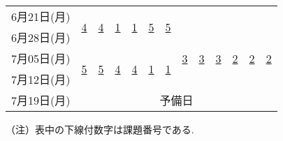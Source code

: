 \documentclass[12pt]{jarticle}
\begin{document}
\begin{table}[htb]
\begin{center}
\begin{tabular}{|l||c|c|c|c|c|c||c|c|c|c|c|c|}
            6月21日(月) & \multirow{2}{*}{{\underline{4}}}                             & \multirow{2}{*}{{\underline{4}}} & \multirow{2}{*}{{\underline{1}}} & \multirow{2}{*}{{\underline{1}}} & \multirow{2}{*}{{\underline{5}}} & \multirow{2}{*}{{\underline{5}}} &                                  &                                  &                                  &                                  &                                  &                                  \\ \cline{8-13}
            6月28日(月) &                                                              &                                  &                                  &                                  &                                  &                                  & \multirow{3}{*}{{\underline{3}}} & \multirow{3}{*}{{\underline{3}}} & \multirow{3}{*}{{\underline{3}}} & \multirow{3}{*}{{\underline{2}}} & \multirow{3}{*}{{\underline{2}}} & \multirow{3}{*}{{\underline{2}}} \\ \cline{2-7}
            7月05日(月) & \multirow{2}{*}{{\underline{5}}}                             & \multirow{2}{*}{{\underline{5}}} & \multirow{2}{*}{{\underline{4}}} & \multirow{2}{*}{{\underline{4}}} & \multirow{2}{*}{{\underline{1}}} & \multirow{2}{*}{{\underline{1}}} &                                  &                                  &                                  &                                  &                                  &                                  \\
            7月12日(月) &                                                              &                                  &                                  &                                  &                                  &                                  &                                  &                                  &                                  &                                  &                                  &                                  \\ \hline \hline
            7月19日(月) & \multicolumn{12}{c|}{予備日}                                                                                                                                                                                                                                                                                                                                                                                                                                  \\ \hline
        \end{tabular}
    \end{center}
\end{table}

\begin{flushright}
    （注）表中の下線付数字は課題番号である.
\end{flushright}



\end{document}
